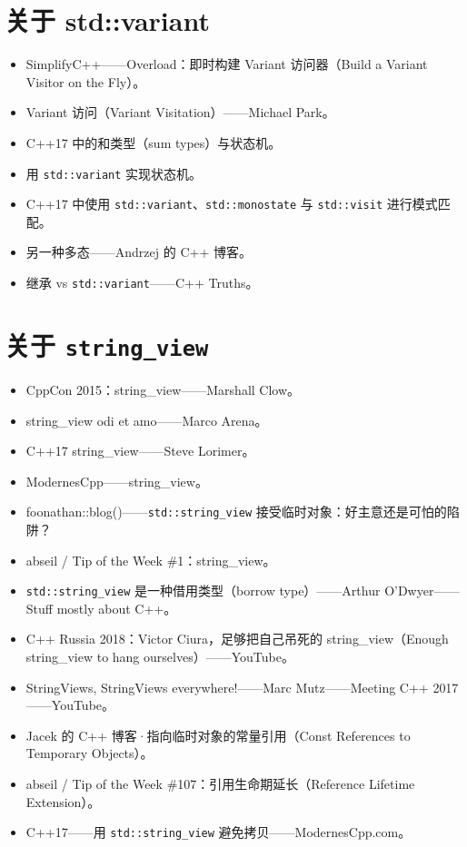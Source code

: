 \section{关于 std::variant}

\begin{itemize}
\item SimplifyC++——Overload：即时构建 Variant 访问器（Build a Variant Visitor on the Fly）。
\item Variant 访问（Variant Visitation）——Michael Park。
\item C++17 中的和类型（sum types）与状态机。
\item 用 \texttt{std::variant} 实现状态机。
\item C++17 中使用 \texttt{std::variant}、\texttt{std::monostate} 与 \texttt{std::visit} 进行模式匹配。
\item 另一种多态——Andrzej 的 C++ 博客。
\item 继承 vs \texttt{std::variant}——C++ Truths。
\end{itemize}

\section{关于 \texttt{string\_view}}

\begin{itemize}
\item CppCon 2015：string\_view——Marshall Clow。
\item string\_view odi et amo——Marco Arena。
\item C++17 string\_view——Steve Lorimer。
\item ModernesCpp——string\_view。
\item foonathan::blog()——\texttt{std::string\_view} 接受临时对象：好主意还是可怕的陷阱？
\item abseil / Tip of the Week \#1：string\_view。
\item \texttt{std::string\_view} 是一种借用类型（borrow type）——Arthur O'Dwyer——Stuff mostly about C++。
\item C++ Russia 2018：Victor Ciura，足够把自己吊死的 string\_view（Enough string\_view to hang ourselves）——YouTube。
\item StringViews, StringViews everywhere!——Marc Mutz——Meeting C++ 2017——YouTube。
\item Jacek 的 C++ 博客·指向临时对象的常量引用（Const References to Temporary Objects）。
\item abseil / Tip of the Week \#107：引用生命期延长（Reference Lifetime Extension）。
\item C++17——用 \texttt{std::string\_view} 避免拷贝——ModernesCpp.com。
\end{itemize}

